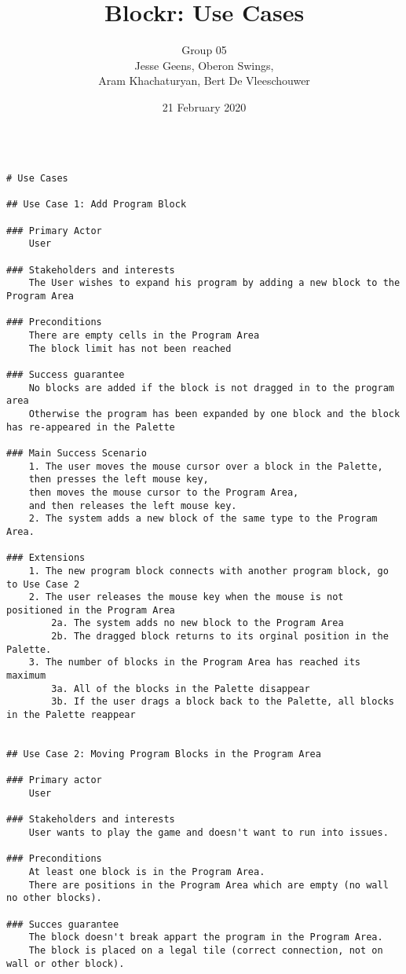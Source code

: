 \documentclass{article}
\title{\vspace{-50pt}Blockr: Use Cases}
\author{Group 05\\ Jesse Geens, Oberon Swings,\\ Aram Khachaturyan, Bert De Vleeschouwer}
\date{21 February 2020}
\begin{document}
\maketitle

\begin{verbatim}

# Use Cases

## Use Case 1: Add Program Block

### Primary Actor 
    User
    
### Stakeholders and interests
    The User wishes to expand his program by adding a new block to the Program Area
    
### Preconditions
    There are empty cells in the Program Area
    The block limit has not been reached
    
### Success guarantee
    No blocks are added if the block is not dragged in to the program area 
    Otherwise the program has been expanded by one block and the block has re-appeared in the Palette
    
### Main Success Scenario
    1. The user moves the mouse cursor over a block in the Palette, 
    then presses the left mouse key, 
    then moves the mouse cursor to the Program Area, 
    and then releases the left mouse key.
    2. The system adds a new block of the same type to the Program Area.
    
### Extensions
    1. The new program block connects with another program block, go to Use Case 2
    2. The user releases the mouse key when the mouse is not positioned in the Program Area
        2a. The system adds no new block to the Program Area
        2b. The dragged block returns to its orginal position in the Palette.
    3. The number of blocks in the Program Area has reached its maximum
        3a. All of the blocks in the Palette disappear
        3b. If the user drags a block back to the Palette, all blocks in the Palette reappear


## Use Case 2: Moving Program Blocks in the Program Area

### Primary actor
    User
    
### Stakeholders and interests
    User wants to play the game and doesn't want to run into issues.

### Preconditions
    At least one block is in the Program Area.
    There are positions in the Program Area which are empty (no wall no other blocks).

### Succes guarantee
    The block doesn't break appart the program in the Program Area.
    The block is placed on a legal tile (correct connection, not on wall or other block).


\end{verbatim}
\end{document}
